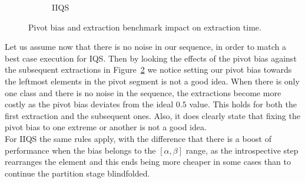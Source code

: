 \begin{figure}
\begin{subfigure}[b]{0.45\textwidth}
        \caption{IIQS}
        \label{FIG:BENCHMARK_07_NOISE_BIAS__0_1}
    \end{subfigure}

    \caption{Pivot bias and extraction benchmark impact on extraction time.}
    \label{FIG:BENCHMARK_07_NOISE_BIAS}
\end{figure}


Let us assume now that there is no noise in our sequence, in order to match a best case execution for IQS. Then by looking the effects of the pivot bias against the subsequent extractions in Figure~\ref{FIG:BENCHMARK_07_NOISE_BIAS} we notice setting our pivot bias towards the leftmost elements in the pivot segment is not a good idea. When there is only one class and there is no noise in the sequence, the extractions become more costly as the pivot bias deviates from the ideal $0.5$ value. This holds for both the first extraction and the subsequent ones. Also, it does clearly state that fixing the pivot bias to one extreme or another is not a good idea. \\

For IIQS the same rules apply, with the difference that there is a boost of performance when the bias belongs to the $[\alpha,\beta]$ range, as the introspective step rearranges the element and this ends being more cheaper in some cases than to continue the partition stage blindfolded.\\

\FloatBarrier